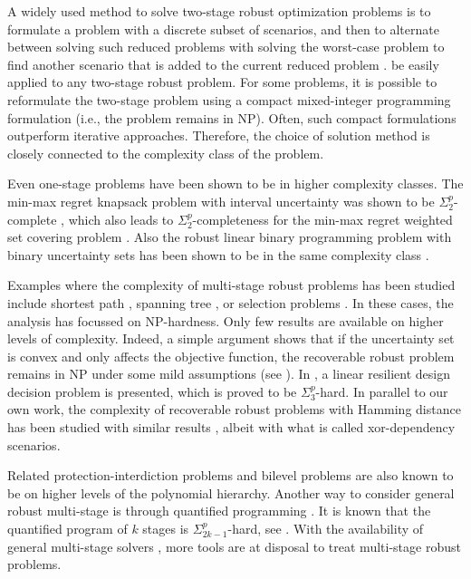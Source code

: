A widely used method to solve two-stage robust optimization problems is to formulate a problem with a discrete subset of scenarios, and then to alternate between solving such reduced problems with solving the worst-case problem to find another scenario that is added to the current reduced problem \cite{aissi2009min,zeng2013solving}. 
 be easily applied to any two-stage robust problem. For some problems, it is possible to reformulate the two-stage problem using a compact mixed-integer programming formulation (i.e., the problem remains in NP). Often, such compact formulations outperform iterative approaches. Therefore, the choice of solution method is closely connected to the complexity class of the problem.

Even one-stage problems have been shown to be in higher complexity classes. The min-max regret knapsack problem with interval uncertainty was shown to be $\Sigma^p_2$-complete \cite{deineko2010pinpointing}, which also leads to $\Sigma^p_2$-completeness for the min-max regret weighted set covering problem \cite{coco2022robust}. Also the robust linear binary programming problem with binary uncertainty sets has been shown to be in the same complexity class \cite{claus2020note}.

Examples where the complexity of multi-stage robust problems has been studied include
shortest path \cite{busing2012recoverable}, spanning tree \cite{kasperski2011approximability}, or selection problems \cite{kasperski2017robust,goerigk2022recoverable}. In these cases, the analysis has focussed on NP-hardness. Only few results are available on higher levels of complexity. Indeed, a simple argument shows that if the uncertainty set is convex and only affects the objective function, the recoverable robust problem remains in NP under some mild assumptions (see \cite{hanasusanto2015k,buchheim2017min,bold2020}). In \cite{pfetsch2021generic}, a linear resilient design decision problem is presented, which is proved to be $\Sigma^p_3$-hard. In parallel to our own work, the complexity of recoverable robust problems with Hamming distance has been studied with similar results \cite{grune2022complexity}, albeit with what is called xor-dependency scenarios.

Related protection-interdiction problems \cite{nabli2022complexity} and bilevel problems \cite{caprara2016bilevel} are also known to be on higher levels of the polynomial hierarchy. Another way to consider general robust multi-stage is through quantified programming \cite{goerigk2021multistage}. It is known that the quantified program of $k$ stages is $\Sigma^p_{2k-1}$-hard, see \cite{chistikov2017complexity,nguyen2020computational}. With the availability of general multi-stage solvers \cite{phdhartisch}, more tools are at disposal to treat multi-stage robust problems.

